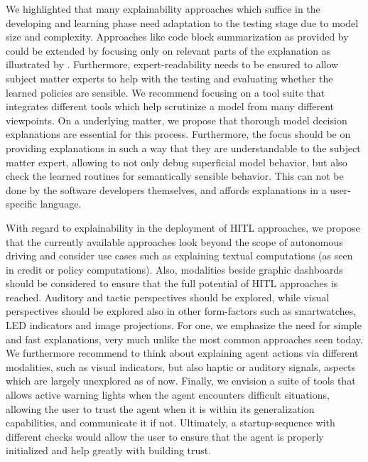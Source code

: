 \documentclass[twoside,11pt]{article}
\begin{document}

We highlighted that many explainability approaches which suffice in the developing and learning phase need adaptation to the testing stage due to model size and complexity. Approaches like code block summarization as provided by \citet{VermaEtAl:2018:ProgrammaticallyInterpretableRL} could be extended by focusing only on relevant parts of the explanation as illustrated by \citet{Vu:2020:PGMExplainer}. Furthermore, expert-readability needs to be ensured to allow subject matter experts to help with the testing and evaluating whether the learned policies are sensible.
We recommend focusing on a tool suite that integrates different tools which help scrutinize a model from many different viewpoints. On a underlying matter, we propose that thorough model decision explanations are essential for this process. Furthermore, the focus should be on providing explanations in such a way that they are understandable to the subject matter expert, allowing to not only debug superficial model behavior, but also check the learned routines for semantically sensible behavior. This can not be done by the software developers themselves, and affords explanations in a user-specific language.


With regard to explainability in the deployment of HITL approaches, we propose that the currently available approaches look beyond the scope of autonomous driving and consider use cases such as explaining textual computations (as seen in credit or policy computations). Also, modalities beside graphic dashboards should be considered to ensure that the full potential of HITL approaches is reached. Auditory and tactic perspectives should be explored, while visual perspectives should be explored also in other form-factors such as smartwatches, LED indicators and image projections.
For one, we emphasize the need for simple and fast explanations, very much unlike the most common approaches seen today. We furthermore recommend to think about explaining agent actions via different modalities, such as visual indicators, but also haptic or auditory signals, aspects which are largely unexplored as of now. Finally, we envision a suite of tools that allows active warning lights when the agent encounters difficult situations, allowing the user to trust the agent when it is within its generalization capabilities, and communicate it if not. Ultimately, a startup-sequence with different checks would allow the user to ensure that the agent is properly initialized and help greatly with building trust.
\end{document}
